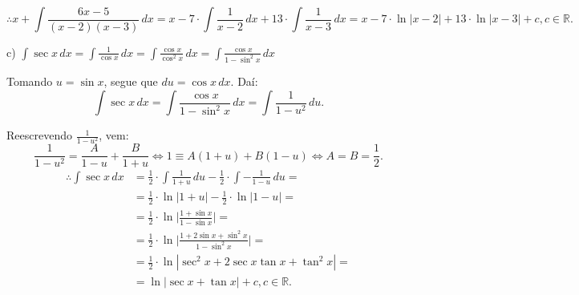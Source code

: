 \documentclass{article}
\begin{document}
{\begin{newpage}
$$\displaystyle{\therefore x + \int \frac{6x-5}{(x-2)(x-3)}\, dx = x - 7\cdot\int \frac{1}{x-2}\, dx + 13\cdot\int \frac{1}{x-3}\, dx = x - 7\cdot\ln{|x-2|} + 13\cdot\ln{|x-3|} + c, c\in\mathbb{R}.}$$
\par
\vspace{0.3cm}
c) $\displaystyle{\int \sec{x}\, dx = \int \frac{1}{\cos{x}}\, dx = \int \frac{\cos{x}}{\cos^{2}{x}}\, dx = \int \frac{\cos{x}}{1 - \sin^{2}{x}}\, dx}$
\par\vspace{0.2cm}
Tomando $u=\sin{x}$, segue que $du = \cos{x}\, dx$. Daí:
\begin{equation*}\displaystyle{\int \sec{x}\, dx = \int \frac{\cos{x}}{1 - \sin^{2}{x}}\, dx = \int \frac{1}{1-u^2}\, du}.\end{equation*}
\par Reescrevendo $\displaystyle{\frac{1}{1-u^2}}$, vem:
\begin{equation*}\displaystyle{\frac{1}{1-u^2} = \frac{A}{1-u} + \frac{B}{1+u} \Leftrightarrow 1\equiv A(1+u) + B(1-u) \Leftrightarrow A=B=\frac{1}{2}.}\end{equation*}
$$\displaystyle{\begin{split}\therefore \int\sec{x}\, dx &= \frac{1}{2}\cdot\int \frac{1}{1+u}\, du-\frac{1}{2}\cdot\int-\frac{1}{1-u}\, du = \\ 
&=\frac{1}{2}\cdot\ln{|1+u|} - \frac{1}{2}\cdot\ln{|1-u|} = \\ &= \frac{1}{2}\cdot\ln{\Big|\frac{1+\sin{x}}{1-\sin{x}}\Big|} = \\ &= \frac{1}{2}\cdot\ln{\Big| \frac{1 + 2\sin{x} + \sin^{2}{x}}{1 - \sin^{2}{x}}\Big|} = \\ &=\frac{1}{2}\cdot\ln{|\sec^{2}{x} + 2\sec{x}\tan{x} + \tan^{2}{x}|} = \\ &=\ln{|\sec{x} + \tan{x}|+c,c\in\mathbb{R}.}\end{split}}$$
\par
\vspace{0.3cm}

\end{newpage}}
\end{document}
